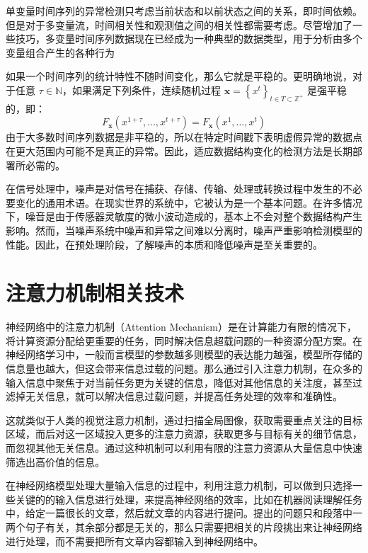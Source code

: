 单变量时间序列的异常检测只考虑当前状态和以前状态之间的关系，即时间依赖。但是对于多变量流，时间相关性和观测值之间的相关性都需要考虑。尽管增加了一些技巧，多变量时间序列数据现在已经成为一种典型的数据类型，用于分析由多个变量组合产生的各种行为


如果一个时间序列的统计特性不随时间变化，那么它就是平稳的。更明确地说，对于任意 $\tau \in \mathbb{N}$，如果满足下列条件，连续随机过程 $\mathbf{x}=\left\{x^t\right\}_{t \in T \subset \mathbb{Z}^{+}}$ 是强平稳的，即：
\begin{equation}
    F_{\mathbf{x}}\left(x^{1+\tau}, \ldots, x^{t+\tau}\right)=F_{\mathbf{x}}\left(x^1, \ldots, x^t\right)
    \end{equation}
由于大多数时间序列数据是非平稳的，所以在特定时间戳下表明虚假异常的数据点在更大范围内可能不是真正的异常。因此，适应数据结构变化的检测方法是长期部署所必需的。

在信号处理中，噪声是对信号在捕获、存储、传输、处理或转换过程中发生的不必要变化的通用术语\cite{yellow23}。在现实世界的系统中，它被认为是一个基本问题。在许多情况下，噪音是由于传感器灵敏度的微小波动造成的，基本上不会对整个数据结构产生影响。然而，当噪声系统中噪声和异常之间难以分离时，噪声严重影响检测模型的性能\cite{yellow24}。因此，在预处理阶段，了解噪声的本质和降低噪声是至关重要的。

\section{注意力机制相关技术}

神经网络中的注意力机制（Attention Mechanism）是在计算能力有限的情况下，将计算资源分配给更重要的任务，同时解决信息超载问题的一种资源分配方案。在神经网络学习中，一般而言模型的参数越多则模型的表达能力越强，模型所存储的信息量也越大，但这会带来信息过载的问题。那么通过引入注意力机制，在众多的输入信息中聚焦于对当前任务更为关键的信息，降低对其他信息的关注度，甚至过滤掉无关信息，就可以解决信息过载问题，并提高任务处理的效率和准确性。

这就类似于人类的视觉注意力机制，通过扫描全局图像，获取需要重点关注的目标区域，而后对这一区域投入更多的注意力资源，获取更多与目标有关的细节信息，而忽视其他无关信息。通过这种机制可以利用有限的注意力资源从大量信息中快速筛选出高价值的信息。

在神经网络模型处理大量输入信息的过程中，利用注意力机制，可以做到只选择一些关键的的输入信息进行处理，来提高神经网络的效率，比如在机器阅读理解任务中，给定一篇很长的文章，然后就文章的内容进行提问。提出的问题只和段落中一两个句子有关，其余部分都是无关的，那么只需要把相关的片段挑出来让神经网络进行处理，而不需要把所有文章内容都输入到神经网络中。

